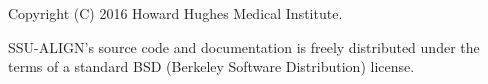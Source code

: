 \vspace*{\fill}
\begin{flushleft}
Copyright (C) 2016 Howard Hughes Medical Institute.

\vspace{2em} 

SSU-ALIGN's source code and documentation is freely
distributed under the terms of a standard BSD 
(Berkeley Software Distribution) license.
\end{flushleft}
